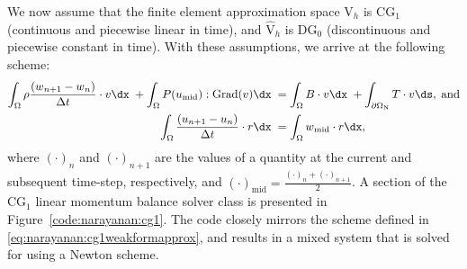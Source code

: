 We now assume that the finite element approximation space
$\mathrm{V}_{h}$ is CG$_{1}$ (continuous and piecewise linear in time),
and $\hat{\mathrm{V}}_{h}$ is DG$_{0}$ (discontinuous and piecewise
constant in time). With these assumptions, we arrive at the following
scheme:
\begin{equation}
  \begin{split}
    \int_{\Omega} \rho \frac{\left(\bw_{n+1} - \bw_{n}\right)}{\Delta
      t} \cdot \bv \dx\; + \int_{\Omega}
    \bP(\bu_{\mathrm{mid}}):\mathrm{Grad}(\bv) \dx\;
    &=  \int_{\Omega} \bB \cdot \bv \dx\;
    +  \int_{\partial\Omega_{\mathrm{N}}} \bT \cdot \bv \ds,
    \; \mathrm{and}\\
    \int_{\Omega} \frac{\left(\bu_{n+1} - \bu_{n}\right)}{\Delta t}
    \cdot \br \dx\;
    &=  \int_{\Omega} \bw_{\mathrm{mid}} \cdot \br \dx,
\end{split}
\label{eq:narayanan:cg1weakformapprox}
\end{equation}
where $(\cdot)_{n}$ and $(\cdot)_{n+1}$ are the values of a
quantity at the current and subsequent time-step, respectively, and
$(\cdot)_{\mathrm{mid}} = \frac{(\cdot)_{n} +
  (\cdot)_{n+1}}{2}$. A section of the CG$_{1}$ linear momentum balance
solver class is presented in Figure~\ref{code:narayanan:cg1}. The
code closely mirrors the scheme defined in
\eqref{eq:narayanan:cg1weakformapprox}, and results in a mixed system
that is solved for using a Newton scheme.

